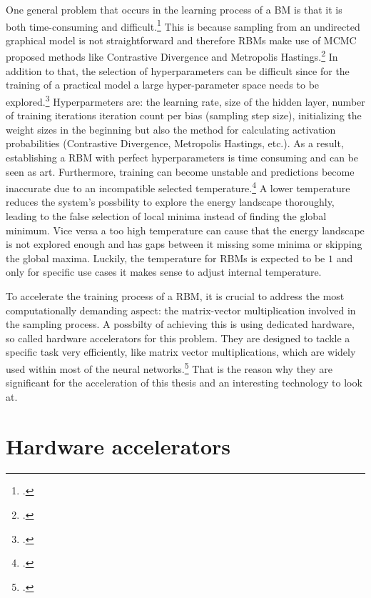 One general problem that occurs in the learning process of a \ac{BM} is that it is both time-consuming and difficult.\footcite[cf.][1-2]{fischerIntroductionRestrictedBoltzmann2012}
This is because sampling from an undirected graphical model is not straightforward and therefore \ac{RBM}s make use
of \ac{MCMC} proposed methods like Contrastive Divergence and Metropolis Hastings.\footcite[cf.][2]{fischerIntroductionRestrictedBoltzmann2012}
In addition to that, the selection of hyperparameters can be difficult since for the training of a practical model a large hyper-parameter space needs to be explored.\footcite[cf.][536]{larochelleClassificationUsingDiscriminative2008}
Hyperparmeters are: the learning rate, size of the hidden layer, number of training iterations iteration count per bias (sampling step size), initializing the weight sizes in the beginning but also the method for calculating activation probabilities (Contrastive Divergence, Metropolis Hastings, etc.).
As a result, establishing a \ac{RBM} with perfect hyperparameters is time consuming and can be seen as art.
Furthermore, training can become unstable and predictions become inaccurate due to an incompatible selected temperature.\footcite[cf.][3-4]{huembeliPhysicsEnergybasedModels2022}
A lower temperature reduces the system's possbility to explore the energy landscape thoroughly, leading to the false selection of local minima instead of finding the global minimum.
Vice versa a too high temperature can cause that the energy landscape is not explored enough and has gaps between it missing some minima or skipping the global maxima. 
Luckily, the temperature for \ac{RBM}s is expected to be \( 1 \) and only for specific use cases it makes sense to adjust internal temperature.

To accelerate the training process of a \ac{RBM}, it is crucial to address the most computationally demanding aspect: the matrix-vector multiplication involved in the sampling process.
A possbilty of achieving this is using dedicated hardware, so called hardware accelerators for this problem. 
They are designed to tackle a specific task very efficiently, like matrix vector multiplications, which are widely used within most of the neural networks.\footcite[cf.][3881-3882]{lehnertMostResourceEfficient2023}
That is the reason why they are significant for the acceleration of this thesis and an interesting technology to look at.  


\section{Hardware accelerators}
